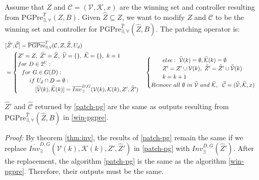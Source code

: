 Assume that $ Z $ and $ \mathcal{C} = (\mathcal{V},\mathcal{K},x) $ are the winning set and controller resulting from  $ \text{PGPre}_{\exists,\forall}^{T} (Z,B)$. Given $ \widehat{Z}\subseteq Z $, we want to modify $ Z $ and $ \mathcal{C} $ to be the winning set and controller for $ \text{PGPre}_{\exists, \forall}^{\widehat{T}}(\widehat{Z},B)$. The patching operator is:
{\small\begin{align}
\begin{split}
&[\widehat{Z}',\widehat{\mathcal{C}}]=\overline{\text{PGPre}}_{\exists,\forall}^{T} (\mathcal{C},Z,\widehat{Z},U_d)\\
&= \begin{cases}
Z' = Z,\ \widehat{Z}'=\widehat{Z},\ \widehat{\mathcal{V}}=\{\},\ \widehat{\mathcal{K}}=\{\},\ k = 1\\
for\ D\in 2^U:\\
\ \ for\ G\in G(D):\\
\ \ \ \ \ \ if\ U_d\cap D = \emptyset:\\
\ \ \ \ \ \ \ \ \  [\widehat{\mathcal{V}}(k),\widehat{\mathcal{K}}(k)]=\overline{Inv}_{\exists}^{D,G}(\mathcal{V}(k),\mathcal{K}(k),Z', \widehat{Z}')\\
\end{cases}
\begin{cases}
\ \ \ \ \ \ else:\ \widehat{\mathcal{V}}(k)=\emptyset, \widehat{\mathcal{K}}(k) = \emptyset\\
\ \ \ \ \ \  Z' = Z'\cup \mathcal{V}(k),\ \widehat{Z}' = \widehat{Z}' \cup \widehat{\mathcal{V}}(k)\\
\ \ \ \ \ \ {\color{black} k = k+1}\\
Remove\ all\ \emptyset\ in\ \widehat{\mathcal{V}}\ and \ \widehat{\mathcal{K}},\ \ 
\widehat{\mathcal{C}} = (\widehat{\mathcal{V}},\widehat{\mathcal{K}},x)
\end{cases}\label{patch-pg}
\end{split}
\end{align}}

\begin{theorem}
	$ \widehat{Z}' $ and $ \widehat{\mathcal{C}} $ returned by \eqref{patch-pg} are the same as outputs resulting from $ \text{PGPre}_{\exists, \forall}^{\widehat{T}}(\widehat{Z},B)$ in \eqref{win-pgpre}.	\label{thm:pg}
\end{theorem}

\emph{Proof:} By theorem \ref{thm:inv}, the results of \eqref{patch-pg} remain the same if we replace $ \overline{Inv}_{\exists}^{D,G}(\mathcal{V}(k),\mathcal{K}(k),Z', \widehat{Z}')$ in \eqref{patch-pg} with $ Inv_\exists^{D,G}(\widehat{Z}') $. After the replacement, the algorithm \eqref{patch-pg} is the same as the algorithm \eqref{win-pgpre}. Therefore, their outputs must be the same. \QEDB


